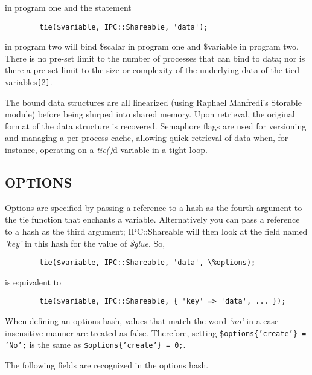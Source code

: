 in program one and the statement
\begin{verbatim}
        tie($variable, IPC::Shareable, 'data');
\end{verbatim}

in program two will bind \$scalar in program one and \$variable in
program two.  There is no pre-set limit to the number of processes
that can bind to data; nor is there a pre-set limit to the size or
complexity of the underlying data of the tied variables{\tt [}2{\tt ]}.

The bound data structures are all linearized (using Raphael Manfredi's
Storable module) before being slurped into shared memory.  Upon
retrieval, the original format of the data structure is recovered.
Semaphore flags are used for versioning and managing a per-process
cache, allowing quick retrieval of data when, for instance, operating
on a {\em tie()\/}d variable in a tight loop.

\subsection*{OPTIONS}%

Options are specified by passing a reference to a hash as the fourth
argument to the tie function that enchants a variable.  Alternatively
you can pass a reference to a hash as the third argument;
IPC::Shareable will then look at the field named {\em 'key'\/} in this hash
for the value of {\em \$glue\/}.  So,
\begin{verbatim}
        tie($variable, IPC::Shareable, 'data', \%options);
\end{verbatim}

is equivalent to
\begin{verbatim}
        tie($variable, IPC::Shareable, { 'key' => 'data', ... });
\end{verbatim}

When defining an options hash, values that match the word {\em 'no'\/} in a
case-insensitive manner are treated as false.  Therefore, setting
{\tt \$options\{'create'\} = 'No';} is the same as {\tt \$options\{'create'\} =
0;}.

The following fields are recognized in the options hash.

